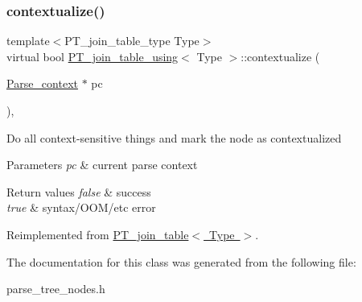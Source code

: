 \subsubsection{\texorpdfstring{contextualize()}{contextualize()}}
{\footnotesize\ttfamily template$<$P\+T\+\_\+join\+\_\+table\+\_\+type Type$>$ \\
virtual bool \mbox{\hyperlink{classPT__join__table__using}{P\+T\+\_\+join\+\_\+table\+\_\+using}}$<$ Type $>$\+::contextualize (\begin{DoxyParamCaption}\item[{\mbox{\hyperlink{structParse__context}{Parse\+\_\+context}} $\ast$}]{pc }\end{DoxyParamCaption})\hspace{0.3cm}{\ttfamily [inline]}, {\ttfamily [virtual]}}

Do all context-\/sensitive things and mark the node as contextualized


\begin{DoxyParams}{Parameters}
{\em pc} & current parse context\\
\hline
\end{DoxyParams}

\begin{DoxyRetVals}{Return values}
{\em false} & success \\
\hline
{\em true} & syntax/\+O\+O\+M/etc error \\
\hline
\end{DoxyRetVals}


Reimplemented from \mbox{\hyperlink{classPT__join__table_aa012b30af4f4d06a215c95d5417dba78}{P\+T\+\_\+join\+\_\+table$<$ Type $>$}}.



The documentation for this class was generated from the following file\+:\begin{DoxyCompactItemize}
\item 
parse\+\_\+tree\+\_\+nodes.\+h\end{DoxyCompactItemize}
